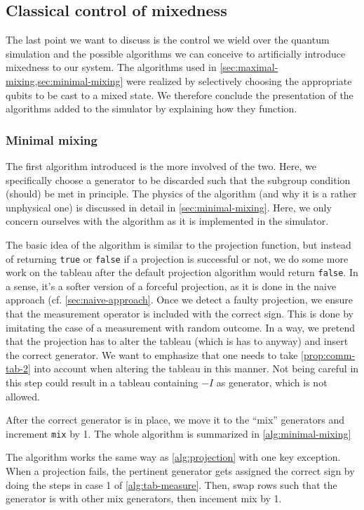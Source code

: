 \subsection{Classical control of mixedness}
The last point we want to discuss is the control we wield over the quantum
simulation and the possible algorithms we can conceive to artificially
introduce mixedness to our system. The algorithms used in
\cref{sec:maximal-mixing,sec:minimal-mixing} were realized
by selectively choosing the appropriate qubits to be cast to a mixed state.
We therefore conclude the presentation of the algorithms added to the simulator
by explaining how they function.

\subsubsection{Minimal mixing}
The first algorithm introduced is the more involved of the two. Here, we
specifically choose a generator to be discarded such that the subgroup
condition (should) be met in principle. The physics of the algorithm (and why
it is a rather unphysical one) is discussed in detail in \cref{sec:minimal-mixing}.
Here, we only concern ourselves with the algorithm as it is implemented in the
simulator.

The basic idea of the algorithm is similar to the projection function, but
instead of returning \verb|true| or \verb|false| if a projection is successful
or not, we do some more work on the tableau after the default projection
algorithm would return \verb|false|. In a sense, it's a softer version of a
forceful projection, as it is done in the naive approach (cf.
\cref{sec:naive-approach}. Once we detect a faulty projection, we ensure that
the measurement operator is included with the correct sign. This is done by
imitating the case of a measurement with random outcome. In a way, we pretend
that the projection has to alter the tableau (which is has to anyway) and
insert the correct generator. We want to emphasize that one needs to take
\cref{prop:comm-tab-2} into account when altering the tableau in this manner.
Not being careful in this step could result in a tableau containing $-I$ as
generator, which is not allowed.

After the correct generator is in place, we
move it to the \enquote{mix} generators and increment \verb|mix| by 1. The
whole algorithm is summarized in \cref{alg:minimal-mixing}

\begin{alg}\label{alg:minimal-mixing}
  The algorithm works the same way as \cref{alg:projection} with one key
  exception. When a projection fails, the pertinent generator gets assigned the
  correct sign by doing the steps in case 1 of \cref{alg:tab-measure}. Then,
  swap rows such that the generator is with other mix generators, then incement
  mix by 1.
\end{alg}

